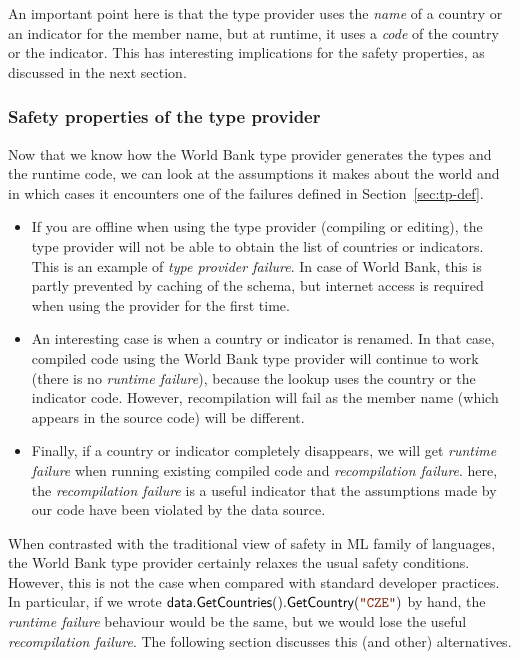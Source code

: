 \documentclass[submission,copyright,creativecommons]{eptcs}
\newcommand{\str}[1]{\textnormal{\textcolor{strclr}{\ttfamily "#1"}}}
\newcommand{\ident}[1]{\textnormal{\sffamily #1}}
\begin{document}
An important point here is that the type provider uses the \emph{name} of a country or an indicator
for the member name, but at runtime, it uses a \emph{code} of the country or the indicator. This has
interesting implications for the safety properties, as discussed in the next section.

\subsubsection{Safety properties of the type provider}

Now that we know how the World Bank type provider generates the types and the runtime code, we can 
look at the assumptions it makes about the world and in which cases it encounters one of the failures
defined in Section~\ref{sec:tp-def}.

\begin{itemize}
\item If you are offline when using the type provider (compiling or editing), the type provider will
  not be able to obtain the list of countries or indicators. This is an example of \emph{type provider
  failure}. In case of World Bank, this is partly prevented by caching of the schema, but internet
  access is required when using the provider for the first time.

\item An interesting case is when a country or indicator is renamed. In that case, compiled code
  using the World Bank type provider will continue to work (there is no \emph{runtime failure}), 
  because the lookup uses the country or the indicator code. However, recompilation will fail
  as the member name (which appears in the source code) will be different.

\item Finally, if a country or indicator completely disappears, we will get \emph{runtime failure}
  when running existing compiled code and \emph{recompilation failure}. here, the \emph{recompilation
  failure} is a useful indicator that the assumptions made by our code have been violated by
  the data source.
\end{itemize}

\noindent
When contrasted with the traditional view of safety in ML family of languages, the World Bank 
type provider certainly relaxes the usual safety conditions. However, this is not the case when 
compared with standard developer practices. In particular, if we wrote 
$\ident{data.GetCountries}().\ident{GetCountry}(\str{CZE})$ by hand, the \emph{runtime failure}
behaviour would be the same, but we would lose the useful \emph{recompilation failure}. The following
section discusses this (and other) alternatives.
\end{document}
